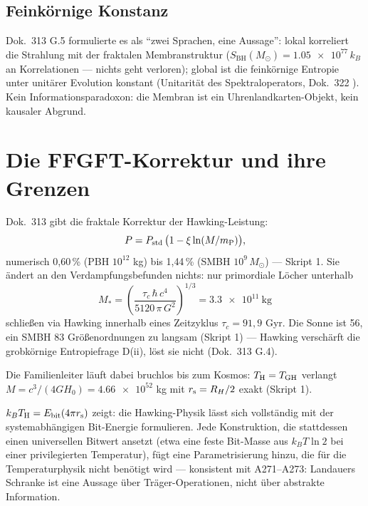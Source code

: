 \subsection{Feinkörnige Konstanz}

Dok.\ 313 G.5 formulierte es als \enquote{zwei Sprachen, eine Aussage}:
lokal korreliert die Strahlung mit der fraktalen Membranstruktur
($S_{\mathrm{BH}}(M_\odot) = \num{1.05e77}\,k_B$ an Korrelationen —
nichts geht verloren); global ist die feinkörnige Entropie unter
unitärer Evolution konstant (Unitarität des Spektraloperators,
Dok.\ 322 \K). Kein Informationsparadoxon: die Membran ist ein
Uhrenlandkarten-Objekt, kein kausaler Abgrund.

\section{Die FFGFT-Korrektur und ihre Grenzen}

Dok.\ 313 gibt die fraktale Korrektur der Hawking-Leistung:
\begin{equation}
  P = P_{\mathrm{std}}\,\bigl(1 - \xi\ln(M/m_{\mathrm{P}})\bigr),
\end{equation}
numerisch 0{,}60\,\% (PBH $10^{12}$ kg) bis 1{,}44\,\% (SMBH $10^9\,M_\odot$)
— Skript 1. Sie ändert an den Verdampfungsbefunden nichts:
nur primordiale Löcher unterhalb
\begin{equation}
  M_* = \left(\frac{\tau_c\,\hbar\,c^4}{5120\,\pi\,G^2}\right)^{1/3}
      = \num{3.3e11}\ \mathrm{kg}
\end{equation}
schließen via Hawking innerhalb eines Zeitzyklus $\tau_c = 91{,}9$ Gyr.
Die Sonne ist 56, ein SMBH 83 Größenordnungen zu langsam
(Skript 1) — Hawking verschärft die grobkörnige Entropiefrage
D(ii), löst sie nicht (Dok.\ 313 G.4). \K

Die Familienleiter läuft dabei bruchlos bis zum Kosmos:
$T_{\mathrm{H}} = T_{\mathrm{GH}}$ verlangt $M = c^3/(4GH_0) = \num{4.66e52}$ kg
mit $r_{\mathrm{s}} = R_H/2$ exakt (Skript 1). \K

\begin{tcolorbox}[warnbox, title={Einordnung des Bit-Befunds}]
  $k_BT_{\mathrm{H}} = E_{\mathrm{bit}}(4\pi r_{\mathrm{s}})$ zeigt: die Hawking-Physik lässt sich
  vollständig mit der systemabhängigen Bit-Energie formulieren.
  Jede Konstruktion, die stattdessen einen universellen Bitwert
  ansetzt (etwa eine feste Bit-Masse aus $k_B T\ln 2$ bei einer
  privilegierten Temperatur), fügt eine Parametrisierung hinzu,
  die für die Temperaturphysik nicht benötigt wird — konsistent
  mit A271–A273: Landauers Schranke ist eine Aussage über
  Träger-Operationen, nicht über abstrakte Information.
\end{tcolorbox}

